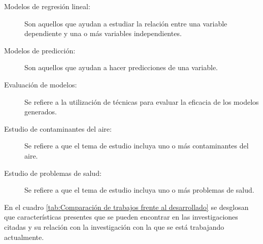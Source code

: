 \begin{description}
\item[Modelos de regresión lineal:]{Son aquellos que ayudan a estudiar la relación entre una variable dependiente y una o más variables independientes.}
\end{description}

\begin{description}
\item[Modelos de predicción:]{Son aquellos que ayudan a hacer predicciones de una variable.}
\end{description}

\begin{description}
\item[Evaluación de modelos:]{Se refiere a la utilización de técnicas para evaluar la eficacia de los modelos generados.}
\end{description}

\begin{description}
\item[Estudio de contaminantes del aire:]{Se refiere a que el tema de estudio incluya uno o más contaminantes del aire.}
\end{description}

\begin{description}
\item[Estudio de problemas de salud:]{Se refiere a que el tema de estudio incluya uno o más problemas de salud.}
\end{description}

En el cuadro \ref{tab:Comparación de trabajos frente al desarrollado} se desglosan que características presentes  que se pueden encontrar en las investigaciones citadas y su relación con la investigación con la que se está trabajando actualmente.\\
\renewcommand{\tablename}{Cuadro}

